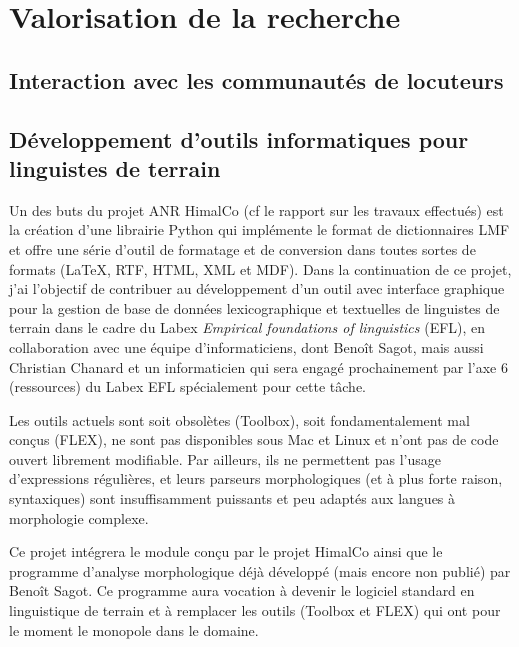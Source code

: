 \documentclass[oldfontcommands,oneside,a4paper,11pt]{article}
\begin{document}
\section{Valorisation de la recherche}

\subsection{Interaction avec les communautés de locuteurs}

\subsection{Développement d'outils informatiques pour linguistes de terrain}
Un des buts du projet ANR HimalCo (cf le rapport sur les travaux effectués) est   la création d'une librairie Python qui implémente le format de dictionnaires LMF et offre une série d'outil de formatage et de conversion dans toutes sortes de formats (\LaTeX, RTF, HTML, XML et MDF). Dans la continuation de ce projet, j'ai l'objectif de contribuer au développement d'un outil avec interface graphique pour la gestion de base de données lexicographique et textuelles de linguistes de terrain dans le cadre du Labex \textit{Empirical foundations of linguistics} (EFL), en collaboration avec une équipe d'informaticiens, dont Benoît Sagot, mais aussi Christian Chanard et un informaticien qui sera engagé prochainement par l'axe 6 (ressources) du Labex EFL spécialement pour cette tâche. 

Les outils actuels sont soit obsolètes (Toolbox), soit fondamentalement mal conçus (FLEX), ne sont pas disponibles sous Mac et Linux et n'ont pas de code ouvert librement modifiable. Par ailleurs, ils ne permettent pas l'usage d'expressions régulières, et leurs parseurs morphologiques (et à plus forte raison, syntaxiques) sont insuffisamment puissants et peu adaptés aux langues à morphologie complexe. 

Ce projet intégrera le module conçu par le projet HimalCo ainsi que le programme d'analyse morphologique déjà développé (mais encore non publié) par Benoît Sagot. Ce programme aura vocation à devenir le logiciel standard en linguistique de terrain et à remplacer les outils (Toolbox et FLEX) qui ont pour le moment le monopole dans le domaine.


 


 
\end{document}
